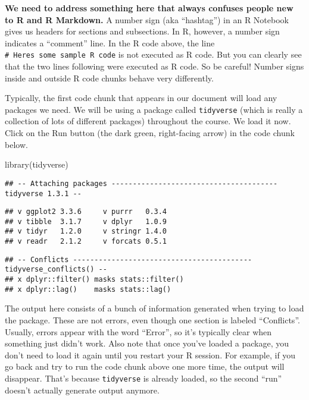 \documentclass[
]{book}
\newenvironment{Shaded}{\begin{snugshade}}{\end{snugshade}}
\newcommand{\FunctionTok}[1]{\textcolor[rgb]{0.00,0.00,0.00}{#1}}
\newcommand{\NormalTok}[1]{#1}
\begin{document}
\textbf{We need to address something here that always confuses people new to R and R Markdown.} A number sign (aka ``hashtag'') in an R Notebook gives us headers for sections and subsections. In R, however, a number sign indicates a ``comment'' line. In the R code above, the line \texttt{\#\ Here\textquotesingle{}s\ some\ sample\ R\ code} is not executed as R code. But you can clearly see that the two lines following were executed as R code. So be careful! Number signs inside and outside R code chunks behave very differently.

Typically, the first code chunk that appears in our document will load any packages we need. We will be using a package called \texttt{tidyverse} (which is really a collection of lots of different packages) throughout the course. We load it now. Click on the Run button (the dark green, right-facing arrow) in the code chunk below.

\begin{Shaded}
\begin{Highlighting}[]
\FunctionTok{library}\NormalTok{(tidyverse)}
\end{Highlighting}
\end{Shaded}

\begin{verbatim}
## -- Attaching packages --------------------------------------- tidyverse 1.3.1 --
\end{verbatim}

\begin{verbatim}
## v ggplot2 3.3.6     v purrr   0.3.4
## v tibble  3.1.7     v dplyr   1.0.9
## v tidyr   1.2.0     v stringr 1.4.0
## v readr   2.1.2     v forcats 0.5.1
\end{verbatim}

\begin{verbatim}
## -- Conflicts ------------------------------------------ tidyverse_conflicts() --
## x dplyr::filter() masks stats::filter()
## x dplyr::lag()    masks stats::lag()
\end{verbatim}

The output here consists of a bunch of information generated when trying to load the package. These are not errors, even though one section is labeled ``Conflicts''. Usually, errors appear with the word ``Error'', so it's typically clear when something just didn't work. Also note that once you've loaded a package, you don't need to load it again until you restart your R session. For example, if you go back and try to run the code chunk above one more time, the output will disappear. That's because \texttt{tidyverse} is already loaded, so the second ``run'' doesn't actually generate output anymore.
\end{document}
